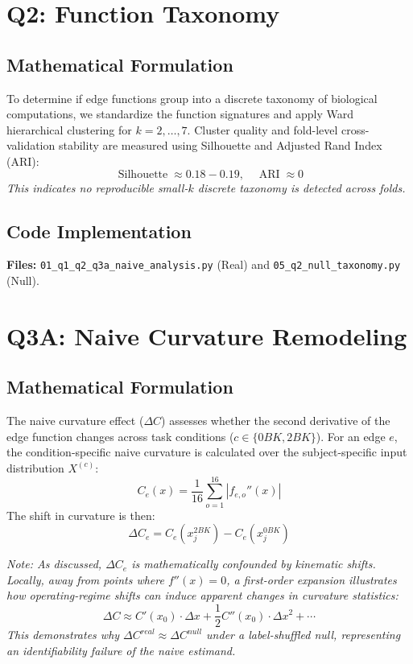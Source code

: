 \documentclass{article}
\begin{document}
\section{Q2: Function Taxonomy}
\subsection{Mathematical Formulation}
To determine if edge functions group into a discrete taxonomy of biological computations, we standardize the function signatures and apply Ward hierarchical clustering for $k=2, \dots, 7$. Cluster quality and fold-level cross-validation stability are measured using Silhouette and Adjusted Rand Index (ARI):
\begin{equation}
\operatorname{Silhouette} \approx 0.18 - 0.19, \quad \operatorname{ARI} \approx 0
\end{equation}
\textit{This indicates no reproducible small-$k$ discrete taxonomy is detected across folds.}

\subsection{Code Implementation}
\textbf{Files:} \texttt{01\_q1\_q2\_q3a\_naive\_analysis.py} (Real) and \texttt{05\_q2\_null\_taxonomy.py} (Null).

\section{Q3A: Naive Curvature Remodeling}
\subsection{Mathematical Formulation}
The naive curvature effect ($\Delta C$) assesses whether the second derivative of the edge function changes across task conditions ($c \in \{0BK, 2BK\}$). For an edge $e$, the condition-specific naive curvature is calculated over the subject-specific input distribution $X^{(c)}$:
\begin{equation}
C_e(x) = \frac{1}{16} \sum_{o=1}^{16} |f_{e,o}''(x)|
\end{equation}
The shift in curvature is then:
\begin{equation}
\Delta C_e = C_e(x_j^{2BK}) - C_e(x_j^{0BK})
\end{equation}

\textit{Note: As discussed, $\Delta C_e$ is mathematically confounded by kinematic shifts. Locally, away from points where $f''(x)=0$, a first-order expansion illustrates how operating-regime shifts can induce apparent changes in curvature statistics:}
\begin{equation}
\Delta C \approx C'(x_0) \cdot \Delta x + \frac{1}{2}C''(x_0) \cdot \Delta x^2 + \cdots
\end{equation}
\textit{This demonstrates why $\Delta C^{real} \approx \Delta C^{null}$ under a label-shuffled null, representing an identifiability failure of the naive estimand.}
\end{document}
